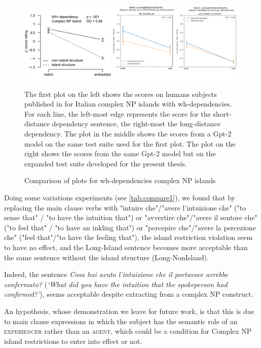 \begin{figure}[H]
	\centering
	\includegraphics[width=1\textwidth]{images/Chapter1/combined_wh-complex.png} 
	\caption{Comparison of plots for wh-dependencies complex NP islands} 
	\label{fig:wh_complex} %
	\medskip
	\small
	The first plot on the left shows the scores on humans subjects published in \citet{sprouse2016experimental} for Italian complex NP islands with wh-dependencies. For each line, the left-most edge represents the score for the short-distance dependency sentence, the right-most the long-distance dependency. The plot in the middle shows the scores from a Gpt-2 model \citep{de2020geppetto} on the same test suite used for the first plot. The plot on the right shows the scores from the same Gpt-2 model but on the expanded test suite developed for the present thesis.
\end{figure}

Doing some variations experiments (see  \autoref{tab:compare1}), we found that by replacing the main clause verbs with "intuire che"/"avere l'intuizione che" ("to sense that" / "to have the intuition that") or "avvertire che"/"avere il sentore che" ("to feel that" / "to have an inkling that") or "percepire che"/"avere la percezione che" ("feel that"/"to have the feeling that"), the island restriction violation seem to have no effect, and the Long-Island sentence becomes more acceptable than the same sentence without the island structure (Long-NonIsland).
 
Indeed, the sentence \textit{Cosa hai avuto l'intuizione che il portavoce avrebbe confermato?} (\textit{`What did you have the intuition that the spokeperson had confirmed?'}), seems acceptable despite extracting from a complex NP construct. 

An hypothesis, whose demonstration we leave for future work, is that this is due to main clause expressions in which the subject has the semantic role of an \textsc{experiencer} rather than an \textsc{agent}, which could be a condition for Complex NP island restrictions to enter into effect or not. 

